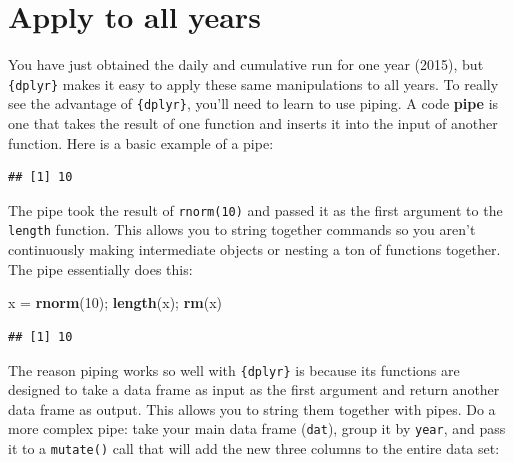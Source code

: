 \documentclass[]{book}
\newenvironment{Shaded}{\begin{snugshade}}{\end{snugshade}}
\newcommand{\KeywordTok}[1]{\textcolor[rgb]{0.13,0.29,0.53}{\textbf{#1}}}
\newcommand{\DecValTok}[1]{\textcolor[rgb]{0.00,0.00,0.81}{#1}}
\newcommand{\StringTok}[1]{\textcolor[rgb]{0.31,0.60,0.02}{#1}}
\newcommand{\OperatorTok}[1]{\textcolor[rgb]{0.81,0.36,0.00}{\textbf{#1}}}
\newcommand{\NormalTok}[1]{#1}
\theoremstyle{definition}
\theoremstyle{definition}
\theoremstyle{definition}
\theoremstyle{remark}
\begin{document}
\section{Apply to all years}\label{apply-to-all-years}

You have just obtained the daily and cumulative run for one year (2015),
but \texttt{\{dplyr\}} makes it easy to apply these same manipulations
to all years. To really see the advantage of \texttt{\{dplyr\}}, you'll
need to learn to use piping. A code \textbf{pipe} is one that takes the
result of one function and inserts it into the input of another
function. Here is a basic example of a pipe:

\begin{Shaded}
\end{Shaded}

\begin{verbatim}
## [1] 10
\end{verbatim}

The pipe took the result of \texttt{rnorm(10)} and passed it as the
first argument to the \texttt{length} function. This allows you to
string together commands so you aren't continuously making intermediate
objects or nesting a ton of functions together. The pipe essentially
does this:

\begin{Shaded}
\begin{Highlighting}[]
\NormalTok{x =}\StringTok{ }\KeywordTok{rnorm}\NormalTok{(}\DecValTok{10}\NormalTok{); }\KeywordTok{length}\NormalTok{(x); }\KeywordTok{rm}\NormalTok{(x)}
\end{Highlighting}
\end{Shaded}

\begin{verbatim}
## [1] 10
\end{verbatim}

The reason piping works so well with \texttt{\{dplyr\}} is because its
functions are designed to take a data frame as input as the first
argument and return another data frame as output. This allows you to
string them together with pipes. Do a more complex pipe: take your main
data frame (\texttt{dat}), group it by \texttt{year}, and pass it to a
\texttt{mutate()} call that will add the new three columns to the entire
data set:
\end{document}

